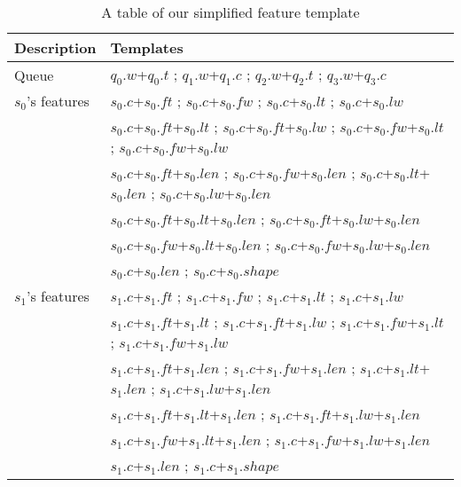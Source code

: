 \begin{table*}[t]
	\caption{\label{simplified feat} A table of our simplified feature template}
	\begin{center}
		\begin{tabular}{|l|l|}
			\hline 
			Description & Templates  \\ 
			\hline
			Queue	 	& $q_0.w$+$q_0.t$   ;   $q_1.w$+$q_1.c$   ;   $q_2.w$+$q_2.t$   ;   $q_3.w$+$q_3.c$ \\
			\hline
			$s_0$'s features	 	& $s_0.c$+$s_0.ft$	 ;   $s_0.c$+$s_0.fw$   ;   $s_0.c$+$s_0.lt$   ;   $s_0.c$+$s_0.lw$ \\
		    & $s_0.c$+$s_0.ft$+$s_0.lt$   ;   $s_0.c$+$s_0.ft$+$s_0.lw$   ;   $s_0.c$+$s_0.fw$+$s_0.lt$   ;   $s_0.c$+$s_0.fw$+$s_0.lw$ \\
		    & $s_0.c$+$s_0.ft$+$s_0.len$   ;   $s_0.c$+$s_0.fw$+$s_0.len$   ;   $s_0.c$+$s_0.lt$+$s_0.len$   ;   $s_0.c$+$s_0.lw$+$s_0.len$ \\
		    & $s_0.c$+$s_0.ft$+$s_0.lt$+$s_0.len$   ;   $s_0.c$+$s_0.ft$+$s_0.lw$+$s_0.len$ \\
		    & $s_0.c$+$s_0.fw$+$s_0.lt$+$s_0.len$   ;	$s_0.c$+$s_0.fw$+$s_0.lw$+$s_0.len$ \\
			& $s_0.c$+$s_0.len$  ;   $s_0.c$+$s_0.shape$\\
			\hline
			$s_1$'s	features 	& $s_1.c$+$s_1.ft$	 ;   $s_1.c$+$s_1.fw$   ;   $s_1.c$+$s_1.lt$   ;   $s_1.c$+$s_1.lw$ \\
			& $s_1.c$+$s_1.ft$+$s_1.lt$   ;   $s_1.c$+$s_1.ft$+$s_1.lw$   ;   $s_1.c$+$s_1.fw$+$s_1.lt$   ;   $s_1.c$+$s_1.fw$+$s_1.lw$ \\
			& $s_1.c$+$s_1.ft$+$s_1.len$   ;   $s_1.c$+$s_1.fw$+$s_1.len$   ;   $s_1.c$+$s_1.lt$+$s_1.len$   ;   $s_1.c$+$s_1.lw$+$s_1.len$ \\
			& $s_1.c$+$s_1.ft$+$s_1.lt$+$s_1.len$   ;   $s_1.c$+$s_1.ft$+$s_1.lw$+$s_1.len$ \\
			& $s_1.c$+$s_1.fw$+$s_1.lt$+$s_1.len$   ;	$s_1.c$+$s_1.fw$+$s_1.lw$+$s_1.len$ \\
			& $s_1.c$+$s_1.len$  ;   $s_1.c$+$s_1.shape$\\
			\hline
		\end{tabular}
	\end{center}
\end{table*}